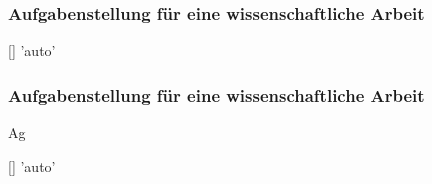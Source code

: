 \documentclass[english,ngerman]{tudscrman3}
\begin{document}
\subsubsection{Aufgabenstellung für eine wissenschaftliche Arbeit}
%
%
\begin{Declaration}{[]}{%
  'auto'%
}
\begin{Declaration}{}
\printdeclarationlist%
%
\end{Declaration}
\end{Declaration}
\clearpage

\subsubsection{Aufgabenstellung für eine wissenschaftliche Arbeit}
%
%
Ag
\begin{Declaration}{[]}{%
  'auto'%
}
\begin{Declaration}{}
\printdeclarationlist%
%
\end{Declaration}
\end{Declaration}
\clearpage
\end{document}
